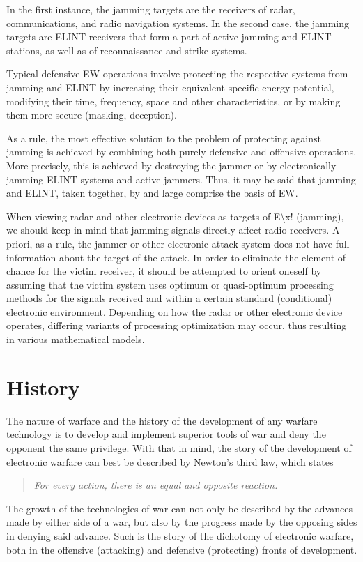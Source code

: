 \documentclass[english,purist]{ist-report}
\begin{document}
In the first instance, the jamming targets are the receivers of radar,
communications, and radio navigation systems. In the second case, the
jamming targets are ELINT receivers that form a part of active jamming and ELINT stations, as well as of reconnaissance and strike systems.

Typical defensive EW operations involve protecting the respective
systems from jamming and ELINT by increasing their equivalent specific
energy potential, modifying their time, frequency, space and other characteristics, or by making them more secure (masking, deception).

As a rule, the most effective solution to the problem of protecting
against jamming is achieved by combining both purely defensive and
offensive operations. More precisely, this is achieved by destroying the jammer or by electronically jamming ELINT systems and active jammers. Thus, it may be said that jamming and ELINT, taken together, by and large comprise the basis of EW. 

When viewing radar and other electronic devices as targets of E\textbackslash x!
(jamming), we should keep in mind that jamming signals directly affect radio receivers. A priori, as a rule, the jammer or other electronic attack system does not have full information about the target of the attack. In order to eliminate the element of chance for the victim receiver, it should be attempted to orient oneself by assuming that the victim system uses optimum or quasi-optimum processing methods for the signals received and within a certain standard (conditional) electronic environment. Depending on how the radar or other electronic device operates, differing variants of processing optimization may occur, thus resulting in various mathematical models.

\part{History}

The nature of warfare and the history of the development of any warfare technology is to develop and implement superior tools of war and deny the opponent the same privilege. With that in mind, the story of the development of electronic warfare can best be described by Newton's third law, which states
\begin{quote}\itshape
    For every action, there is an equal and opposite reaction.
\end{quote}
The growth of the technologies of war can not only be described by the advances made by either side of a war, but also by the progress made by the opposing sides in denying said advance. Such is the story of the dichotomy of electronic warfare, both in the offensive (attacking) and defensive (protecting) fronts of development.
\end{document}
